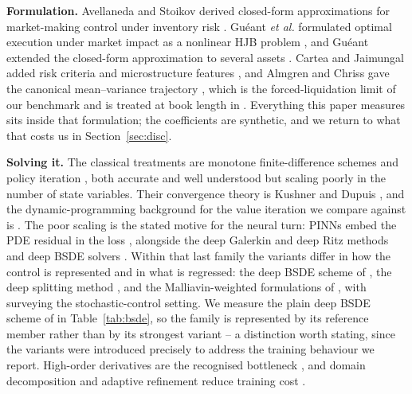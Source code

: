 \documentclass[conference]{IEEEtran}
\begin{document}
\textbf{Formulation.} Avellaneda and Stoikov derived closed-form approximations for market-making
control under inventory risk \cite{avellaneda2008high}. Gu\'eant \emph{et al.} formulated optimal
execution under market impact as a nonlinear HJB problem \cite{gueant2013dealing}, and Gu\'eant
extended the closed-form approximation to several assets \cite{gueant2016closed}. Cartea and
Jaimungal added risk criteria and microstructure features \cite{cartea2015risk}, and Almgren and
Chriss gave the canonical mean--variance trajectory \cite{almgren2000optimal}, which is the
forced-liquidation limit of our benchmark and is treated at book length in
\cite{cartea2015algorithmic}. Everything this paper measures sits inside that formulation; the
coefficients are synthetic, and we return to what that costs us in Section~\ref{sec:disc}.

\textbf{Solving it.} The classical treatments are monotone finite-difference schemes
\cite{forsyth2017epsilon} and policy iteration \cite{howard1960dynamic}, both accurate and well
understood but scaling poorly in the number of state variables. Their convergence theory is Kushner
and Dupuis \cite{kushner1990numerical}, and the dynamic-programming background for the value
iteration we compare against is \cite{bertsekas2012dynamic}. The poor scaling is the stated motive
for the neural turn: PINNs embed the PDE residual in the loss \cite{raissi2019physics}, alongside
the deep Galerkin and deep Ritz methods \cite{sirignano2018dgm,yu2018deep} and deep BSDE solvers
\cite{e2017deep,han2018solving}. Within that last family the variants differ in how the control is
represented and in what is regressed: the deep BSDE scheme of \cite{han2018deep}, the deep
splitting method \cite{beck2019deep}, and the Malliavin-weighted formulations of
\cite{fujii2019ml}, with \cite{pham2021stochastic} surveying the stochastic-control setting. We
measure the plain deep BSDE scheme of \cite{e2017deep,han2018solving} in
Table~\ref{tab:bsde}, so the family is represented by its reference member rather than by its
strongest variant \cite{hure2020deep,germain2022approximation,e2019multilevel} -- a distinction
worth stating, since the variants were introduced precisely to
address the training behaviour we report. High-order derivatives are the recognised bottleneck
\cite{hutzenthaler2022overcoming}, and domain decomposition and adaptive refinement reduce training
cost \cite{meng2020ppinn,moseley2021finite}.
\end{document}
